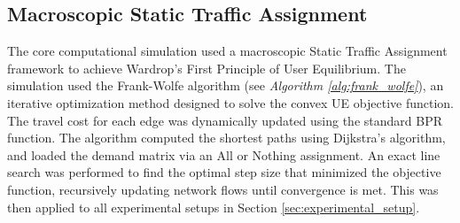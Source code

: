 


\subsection{Macroscopic Static Traffic Assignment}
\label{sec:sta}

The core computational simulation used a macroscopic Static Traffic Assignment framework to achieve Wardrop's First Principle of User Equilibrium. The simulation used the Frank-Wolfe algorithm (see \textit{Algorithm \ref{alg:frank_wolfe}}), an iterative optimization method designed to solve the convex UE objective function. The travel cost for each edge was dynamically updated using the standard BPR function. The algorithm computed the shortest paths using Dijkstra's algorithm, and loaded the demand matrix via an All or Nothing assignment. An exact line search was performed to find the optimal step size that minimized the objective function, recursively updating network flows until convergence is met. This was then applied to all experimental setups in Section \ref{sec:experimental_setup}.


